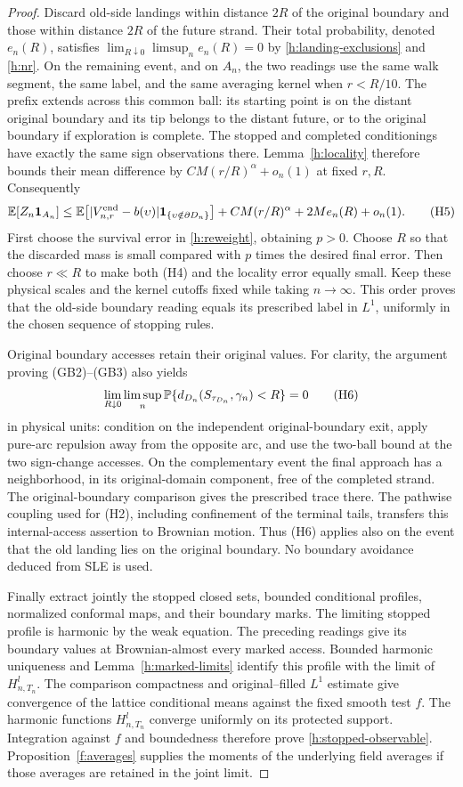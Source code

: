 \begin{proof}
Discard old-side landings within distance $2R$ of the original
boundary and those within distance $2R$ of the future strand.
Their total probability, denoted $e_n(R)$, satisfies
$\lim_{R\downarrow0}\limsup_n e_n(R)=0$ by
\eqref{h:landing-exclusions} and \eqref{h:nr}.
On the remaining event, and on $A_n$, the two readings use the
same walk segment, the same label, and the same averaging kernel
when $r<R/10$. The prefix extends across this common ball:
its starting point is on the distant original boundary and its
tip belongs to the distant future, or to the original boundary
if exploration is complete. The stopped and completed
conditionings have exactly the same sign observations there.
Lemma~\ref{h:locality} therefore bounds their mean difference by
$CM(r/R)^\alpha+o_n(1)$ at fixed $r,R$. Consequently
\[
 \mathbb E[Z_n\mathbf1_{A_n}]
 \le \mathbb E\!\left[|V^{\rm end}_{n,r}-b(\upsilon)|
              \mathbf1_{\{\upsilon\notin\partial D_n\}}\right]
       +CM(r/R)^\alpha+2M e_n(R)+o_n(1).                 \tag{H5}
\]
First choose the survival error in \eqref{h:reweight}, obtaining
$p>0$. Choose $R$ so that the discarded mass is small compared
with $p$ times the desired final error. Then choose $r\ll R$
to make both (H4) and the locality error equally small.
Keep these physical scales and the kernel cutoffs fixed while
taking $n\to\infty$. This order proves that the old-side boundary
reading equals its prescribed label in $L^1$, uniformly in
the chosen sequence of stopping rules.

Original boundary accesses retain their original values.
For clarity, the argument proving (GB2)--(GB3) also yields
\[
 \lim_{R\downarrow0}\limsup_n
 \mathbb P\{d_{D_n}(S_{\tau_{D_n}},\gamma_n)<R\}=0
 \tag{H6}
\]
in physical units: condition on the independent original-boundary
exit, apply pure-arc repulsion away from the opposite arc, and
use the two-ball bound at the two sign-change accesses.
On the complementary event the final approach has a neighborhood,
in its original-domain component, free of the completed strand.
The original-boundary comparison gives the prescribed trace there.
The pathwise coupling used for (H2), including confinement of the
terminal tails, transfers this internal-access assertion to
Brownian motion. Thus (H6) applies also on the event that the
old landing lies on the original boundary. No boundary avoidance
deduced from SLE is used.

Finally extract jointly the stopped closed sets, bounded conditional
profiles, normalized conformal maps, and their boundary marks.
The limiting stopped profile is harmonic by the weak equation.
The preceding readings give its boundary values at Brownian-almost
every marked access. Bounded harmonic uniqueness and
Lemma~\ref{h:marked-limits} identify this profile with the limit
of $H^l_{n,T_n}$. The comparison compactness and original--filled
$L^1$ estimate give convergence of the lattice conditional means
against the fixed smooth test $f$. The harmonic functions $H^l_{n,T_n}$
converge uniformly on its protected support. Integration against $f$
and boundedness therefore prove \eqref{h:stopped-observable}.
Proposition~\ref{f:averages} supplies the moments of the underlying
field averages if those averages are retained in the joint limit.


\end{proof}
